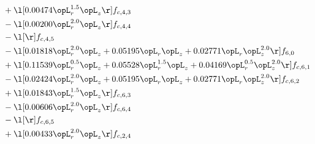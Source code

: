 \begin{alignat}{2}
& + \l[  0.00474 \opL_r^{1.5} \opL_z  \r] f_{c,4,3} \nonumber \\ 
& - \l[  0.00200 \opL_r^{2.0} \opL_z  \r] f_{c,4,4} \nonumber \\ 
& - \l[  \r] f_{c,4,5} \nonumber \\ 
& - \l[  0.01818 \opL_r^{2.0} \opL_z +  0.05195 \opL_r \opL_z +  0.02771 \opL_r \opL_z^{2.0}  \r] f_{6,0} \nonumber \\ 
& + \l[  0.11539 \opL_r^{0.5} \opL_z +  0.05528 \opL_r^{1.5} \opL_z +  0.04169 \opL_r^{0.5} \opL_z^{2.0}  \r] f_{c,6,1} \nonumber \\ 
& - \l[  0.02424 \opL_r^{2.0} \opL_z +  0.05195 \opL_r \opL_z +  0.02771 \opL_r \opL_z^{2.0}  \r] f_{c,6,2} \nonumber \\ 
& + \l[  0.01843 \opL_r^{1.5} \opL_z  \r] f_{c,6,3} \nonumber \\ 
& - \l[  0.00606 \opL_r^{2.0} \opL_z  \r] f_{c,6,4} \nonumber \\ 
& - \l[  \r] f_{c,6,5} \nonumber \\ 
& + \l[  0.00433 \opL_r^{2.0} \opL_z  \r] f_{c,2,4} \nonumber \\ 
\end{alignat} 


